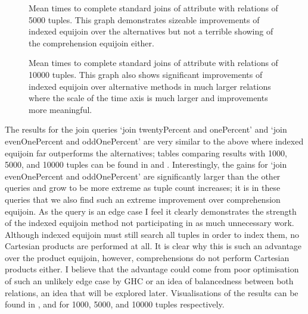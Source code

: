 \begin{figure}[p]
    
    \caption{Mean times to complete standard joins of 
     attribute with relations of 5000 tuples. This
graph demonstrates sizeable improvements of indexed equijoin over the
alternatives but not a terrible showing of the comprehension equijoin either.}
    \label{fig:benchmark:onePercent-5000}
\end{figure}

\begin{figure}[p]
    
    \caption{Mean times to complete standard joins of
     attribute with relations of 10000 tuples.
This graph also shows significant improvements of indexed equijoin over
alternative methods in much larger relations where the scale of the time axis is
much larger and improvements more meaningful.}
    \label{fig:benchmark:onePercent-10000}
\end{figure}

The results for the join queries `join twentyPercent and onePercent' and `join
evenOnePercent and oddOnePercent' are very similar to the above
where indexed equijoin far outperforms the alternatives; tables comparing
results with 1000, 5000, and 10000 tuples can be found in
 and
. Interestingly,
the gains for `join evenOnePercent and oddOnePercent' are significantly larger
than the other queries and grow to be more extreme as tuple count increases; it
is in these queries that we also find such an extreme improvement over
comprehension equijoin. As the query is an edge case I feel it clearly
demonstrates the strength of the indexed equijoin method not participating in as
much unnecessary work. Although indexed equijoin must still search all tuples in
order to index them, no Cartesian products are performed at all. It is clear why
this is such an advantage over the product equijoin, however, comprehensions do
not perform Cartesian products either. I believe that the advantage could come
from poor optimisation of such an unlikely edge case by GHC or an idea of
balancedness between both relations, an idea that will be explored later.
Visualisations of the results can be found in
,  and
 for 1000, 5000, and 10000 tuples respectively.


